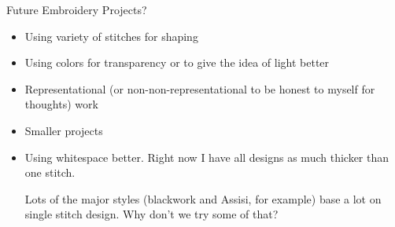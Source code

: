 		\item Future Embroidery Projects?
		\begin{itemize}  
			\item Using variety of stitches for shaping  
			\item Using colors for transparency or to give the idea of light better  
			\item Representational (or non-non-representational to be honest to myself for thoughts) work  
			\item Smaller projects  
			\item Using whitespace better. Right now I have all designs as much thicker than one stitch.  
					
Lots of the major styles (blackwork and Assisi, for example) base a lot on single stitch design. Why don't we try some of that?  
		\end{itemize}
